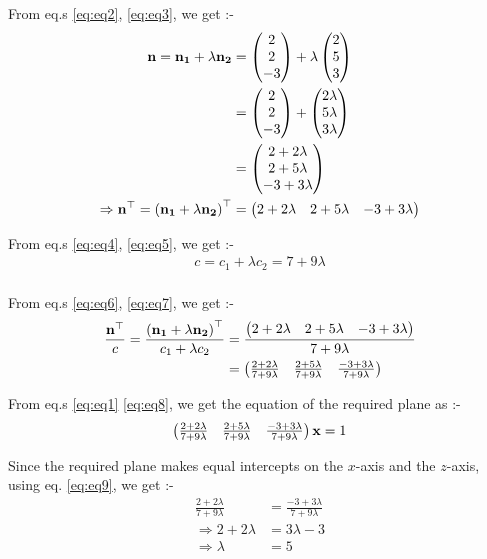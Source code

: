 \documentclass[journal,12pt,twocolumn]{IEEEtran}
\renewcommand\thesection{\arabic{section}}
\begin{document}
\begin{enumerate}[label=\thesection.\arabic*.,ref=\thesection.\theenumi]
From eq.s \eqref{eq:eq2}, \eqref{eq:eq3}, we get :-
\begin{align}
\mathbf{n} = \mathbf{n_1} + \lambda \mathbf{n_2} &= \begin{pmatrix}2 \\ 2 \\ -3\end{pmatrix} + \lambda \begin{pmatrix}2 \\ 5 \\ 3\end{pmatrix}
\\
&= \begin{pmatrix}2 \\ 2 \\ -3\end{pmatrix} + \begin{pmatrix}2 \lambda \\ 5 \lambda \\ 3 \lambda\end{pmatrix}
\\
&= \begin{pmatrix}2 + 2 \lambda \\ 2 + 5 \lambda \\ -3 + 3 \lambda\end{pmatrix}
\\
\Rightarrow \mathbf{n}^{\top} = \left( \mathbf{n_1} + \lambda \mathbf{n_2} \right)^{\top} &= \begin{pmatrix}2 + 2 \lambda & 2 + 5 \lambda & -3 + 3 \lambda\end{pmatrix} \label{eq:eq6}
\end{align}

From eq.s \eqref{eq:eq4}, \eqref{eq:eq5}, we get :-
\begin{align}
c = c_1 + \lambda c_2 = 7 + 9 \lambda \label{eq:eq7}
\end{align}
\\
From eq.s \eqref{eq:eq6}, \eqref{eq:eq7}, we get :-
\begin{align}
\frac{\mathbf{n}^{\top}}{c} = \frac{\left( \mathbf{n_1} + \lambda \mathbf{n_2} \right)^{\top}}{c_1 + \lambda c_2} &= \frac{\begin{pmatrix}2 + 2 \lambda & 2 + 5 \lambda & -3 + 3 \lambda\end{pmatrix}}{7 + 9 \lambda}
\\
&= \begin{pmatrix}\frac{2 + 2 \lambda}{7 + 9 \lambda} & \frac{2 + 5 \lambda}{7 + 9 \lambda} & \frac{-3 + 3 \lambda}{7 + 9 \lambda}\end{pmatrix} \label{eq:eq8}
\end{align}

From eq.s \eqref{eq:eq1} \eqref{eq:eq8}, we get the equation of the required plane as :-
\begin{align}
\begin{pmatrix}\frac{2 + 2 \lambda}{7 + 9 \lambda} & \frac{2 + 5 \lambda}{7 + 9 \lambda} & \frac{-3 + 3 \lambda}{7 + 9 \lambda}\end{pmatrix}\mathbf{x} = 1 \label{eq:eq9}
\end{align}

Since the required plane makes equal intercepts on the $x$-axis and the $z$-axis, using eq. \eqref{eq:eq9}, we get :-
\begin{align}
\frac{2 + 2 \lambda}{7 + 9 \lambda} &= \frac{-3 + 3 \lambda}{7 + 9 \lambda}
\\
\Rightarrow 2 + 2 \lambda &= 3 \lambda - 3
\\
\Rightarrow \lambda &= 5 \label{eq:eq10}
\end{align}


\end{enumerate}
\end{document}
